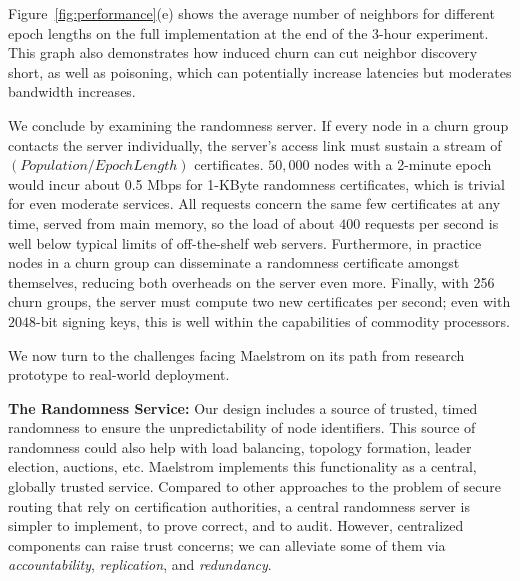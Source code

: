 \documentclass[10pt,twocolumn]{article}
\renewcommand{\paragraph}[1]{\textbf{#1:}}
\begin{document}
Figure~\ref{fig:performance}(e) shows the average number of
neighbors for different epoch lengths on the full implementation at the
end of the 3-hour experiment. This graph also demonstrates how
induced churn can cut neighbor discovery short, as well as poisoning, which can potentially increase latencies
but moderates bandwidth increases.

We conclude by examining the
randomness server.  If
every node in a churn group contacts the server
individually, the server's access link must sustain a stream of
$(\mathit{Population}/\mathit{EpochLength})$ certificates.
$50,000$ nodes with a 2-minute epoch would incur about 0.5 Mbps for
1-KByte 
randomness certificates, which
is trivial for even moderate services.  All requests concern the
same few certificates at any time, served from main memory, so the load
of about
$400$ requests per second is well below typical limits of off-the-shelf
web servers.  Furthermore, in practice nodes in a churn group can
disseminate a randomness certificate amongst themselves, reducing both
overheads on the server even more.  Finally, with 256 churn groups, the
server must compute two new certificates per second; even with
$2048$-bit signing keys, this is well within the capabilities of commodity processors.





\label{sec:discussion}

We now turn to the challenges
facing Maelstrom on its path from research prototype to real-world deployment.

\paragraph{The Randomness Service}
Our design includes a source of trusted, timed randomness to
ensure the unpredictability of node identifiers. This source of randomness could also help with load
balancing, topology formation, leader election, auctions, etc.
Maelstrom implements this functionality as a 
central, globally trusted service. Compared to other approaches to the
problem of secure routing that rely on certification authorities, a
central randomness server is simpler to implement, to prove correct, and
to audit.  However, centralized components can raise trust concerns; we
can alleviate some of them via \emph{accountability},
\emph{replication}, and \emph{redundancy}.
\end{document}
